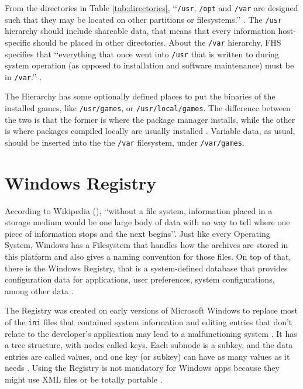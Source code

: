 From the directories in Table \ref{tab:directories}, \lq\lq \texttt{/usr}, \texttt{/opt} and \texttt{/var} are designed such that they may be located on other partitions or filesystems.\rq\rq{} \cite{allbery2015filesystem}. The \texttt{/usr} hierarchy should include shareable data, that means that every information host-specific should be placed in other directories. About the \texttt{/var} hierarchy, FHS specifies that \lq\lq everything that once went into \texttt{/usr} that is written to during system operation (as opposed to installation and software maintenance) must be in \texttt{/var}.\rq\rq{} \cite{allbery2015filesystem}.

The Hierarchy has some optionally defined places to put the binaries of the installed games, like \texttt{/usr/games}, or \texttt{/usr/local/games}. The difference between the two is that the former is where the package manager installs, while the other is where packages compiled locally are usually installed \cite{blfsdevelopmentteam2017}. Variable data, as usual, should be inserted into the the \texttt{/var} filesystem, under \texttt{/var/games}.


\section{Windows Registry}
\label{sec:win_filesystem}

According to Wikipedia (\citeyear{wikipedia2017filesystem}), \lq\lq without a file system, information placed in a storage medium would be one large body of data with no way to tell where one piece of information stops and the next begins\rq\rq{}. Just like every Operating System, Windows has a Filesystem that handles how the archives are stored in this platform and also gives a naming convention for those files. On top of that, there is the Windows Registry, that is a system-defined database \cite{windowsregistry2017} that provides configuration data for applications, user preferences, system configurations, among other data \cite{fisher_2017}.

The Registry was created on early versions of Microsoft Windows to replace most of the \texttt{ini} files that contained system information and editing entries that don't relate to the developer's application may lead to a malfunctioning system \cite{microsoft2017registryinfo}. It has a tree structure, with nodes called keys. Each subnode is a subkey, and the data entries are called values, and one key (or subkey) can have as many values as it needs \cite{windows2017registrystructure}. Using the Registry is not mandatory for Windows apps because they might use XML files or be totally portable \cite{fisher_2017}.


